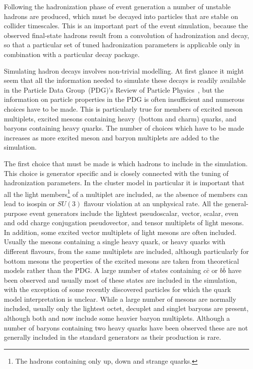 
 Following the hadronization phase of event generation a number of unstable
 hadrons are produced, which must be decayed into particles that are
 stable on collider timescales.
 This is an important part of the event
 simulation, because the observed final-state hadrons result
 from a convolution of hadronization and decay, so that a particular set
 of tuned hadronization parameters is applicable only in combination
 with a particular decay package.

 Simulating hadron decays involves non-trivial modelling.
 At first glance it might seem that all the information
 needed to simulate these decays is readily available in the Particle Data Group~(PDG)'s
 Review of Particle Physics~\cite{Amsler:2008zzb}, but the information
 on particle properties in the PDG is often insufficient and numerous choices have to be made.
 This is particularly true for members of excited meson multiplets, excited mesons containing
 heavy~(bottom and charm) quarks, and baryons containing heavy quarks.
 The number of choices which have to be made
 increases as more excited meson and baryon multiplets
 are added to the simulation.

 The first choice that must be made is which hadrons to include in the simulation.
 This choice is generator specific and is closely connected with
 the tuning of hadronization parameters.  In the cluster model in particular it
 is important that all the light members\footnote{The hadrons containing only up, down and strange quarks.}
 of a multiplet are included, as the absence of members can lead to isospin or $SU(3)$ flavour
 violation at an unphysical rate. All the general-purpose event
 generators include the lightest pseudoscalar, vector, scalar, even and odd charge conjugation
 pseudovector, and tensor multiplets of light mesons. In addition, some excited
 vector  multiplets of light mesons are often included. Usually the mesons containing
 a single heavy quark, or heavy quarks with different flavours,
 from the same multiplets are included, although particularly
 for bottom mesons the properties of the excited mesons are taken from theoretical models
 rather than the PDG. A large number of states containing $c\bar c$ or $b\bar b$ have been
 observed and usually most of these states are included in the simulation, with the
 exception of some recently discovered particles for which the quark model interpretation
 is unclear. While a large number of mesons are normally included, usually only the
 lightest octet, decuplet and singlet baryons are present, although both \herwigpp and
 \Sherpa now include some heavier baryon multiplets. Although a number of
 baryons containing two heavy quarks have been observed these are not generally
 included in the standard generators as their production is rare.

